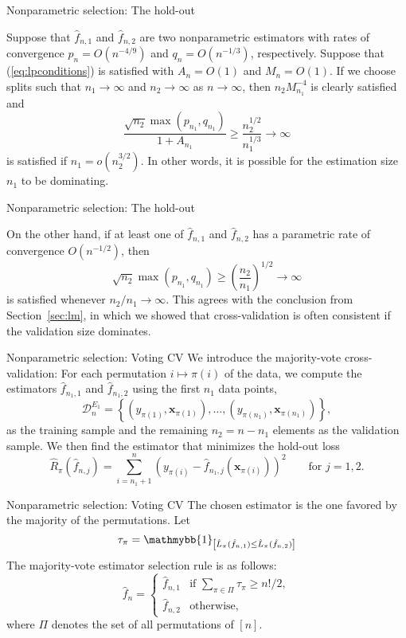 \documentclass{beamer}
\newcommand{\0}{\emptyset}
\newcommand{\paren}[1]{\left(#1 \right)}
\newcommand{\sqbr}[1]{\left[#1 \right]}
\newcommand{\set}[1]{\left\{ #1 \right\}}
\newcommand{\ind}[1]{\mathmybb{1}_{\sqbr{#1}}}
\newcommand{\data}{\mathcal{D}_{n}}
\newcommand{\x}{\boldsymbol{x}}
\newcommand{\fhat}[2]{\hat{f}_{#1, #2}}
\newcommand{\1}{\mathmybb{1}}
\begin{document}
\begin{frame}{Nonparametric selection: The hold-out}
  \begin{example}
    Suppose that \(\fhat{n}{1}\) and \(\fhat{n}{2}\) are two nonparametric estimators with rates of convergence \(p_{n}=O\paren{n^{-4/9}}\) and \(q_{n}=O\paren{n^{-1/3}}\), respectively. Suppose that (\ref{eq:lpconditions}) is satisfied with \(A_{n} = O(1)\) and \(M_{n}=O(1)\). If we choose splits such that \(n_{1}\to\infty\) and \(n_{2}\to\infty\) as \(n\to\infty\), then \(n_{2}M_{n_{1}}^{-4}\) is clearly satisfied and 
    \[\frac{\sqrt{n_{2}}\max(p_{n_{1}}, q_{n_{1}})}{1+A_{n_{1}}} \geq \frac{n_{2}^{1/2}}{n_{1}^{1/3}}\to\infty \]
    is satisfied if \(n_{1}=o\paren{n_{2}^{3/2}}\). In other words, it is possible for the estimation size \(n_{1}\) to be dominating.
  \end{example}
\end{frame}

\begin{frame}{Nonparametric selection: The hold-out}
  \begin{example}
    On the other hand, if at least one of \(\fhat{n}{1}\) and \(\fhat{n}{2}\) has a parametric rate of convergence \(O(n^{-1/2})\), then
    \[\sqrt{n_{2}}\max(p_{n_{1}},q_{n_{1}})\geq \paren{\frac{n_{2}}{n_{1}}}^{1/2}\to\infty\]
    is satisfied whenever \(n_{2}/n_{1}\to\infty\). This agrees with the conclusion from Section~\ref{sec:lm}, in which we showed that cross-validation is often consistent if the validation size dominates.
  \end{example}
\end{frame}

\begin{frame}{Nonparametric selection: Voting CV}
   We introduce the \alert{majority-vote cross-validation}: For each permutation \(i\mapsto\pi(i)\) of the data, we compute the estimators \(\fhat{n_{1}}{1}\) and \(\fhat{n_{1}}{2}\) using the first \(n_{1}\) data points,
  \[\data^{E_{1}} = \set{\paren{y_{\pi(1)}, \x_{\pi(1)}}, \ldots,\paren{y_{\pi(n_1)}, \x_{\pi(n_1)}}},\]
  as the training sample and the remaining \(n_{2}=n-n_{1}\) elements as the validation sample. We then find the estimator that minimizes the hold-out loss
  \[\hat{R}_{\pi}(\fhat{n}{j}) = \sum_{i=n_{1}+1}^{n}\paren{y_{\pi(i)} - \fhat{n_{1}}{j}\paren{\x_{\pi(i)}}}^{2}\qquad \text{for }j=1,2.\]
\end{frame}

\begin{frame}{Nonparametric selection: Voting CV}
  The chosen estimator is the one favored by the majority of the permutations.
  Let 
  \[\tau_{\pi} = \ind{\hat{L}_{\pi}(\fhat{n}{1}) \leq \hat{L}_{\pi}(\fhat{n}{2})}\]
  The majority-vote estimator selection rule is as follows:
  \[\hat{f}_{n} = \begin{cases}
      \fhat{n}{1} &\text{if }\sum_{\pi\in\Pi}\tau_{\pi} \geq {n!}/{2},\\[2mm]
      \fhat{n}{2} &\text{otherwise,}
  \end{cases}\]
  where \(\Pi\) denotes the set of all permutations of \([n]\).
\end{frame}
\end{document}
